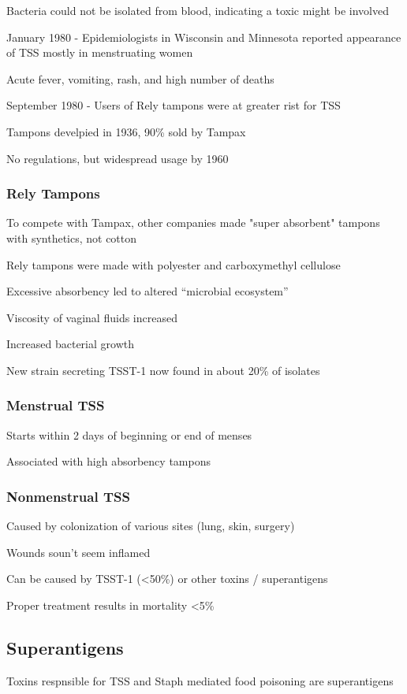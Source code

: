 \documentclass{notes}
\begin{document}
Bacteria could not be isolated from blood, indicating a toxic might be involved

January 1980 - Epidemiologists in Wisconsin and Minnesota reported appearance of TSS mostly in menstruating women

\tab \indicates Acute fever, vomiting, rash, and high number of deaths

September 1980 - Users of Rely tampons were at greater rist for TSS

Tampons develpied in 1936, 90\% sold by Tampax

No regulations, but widespread usage by 1960

\subsubsection*{Rely Tampons}
To compete with Tampax, other companies made "super absorbent" tampons with synthetics, not cotton

\tab \indicates Rely tampons were made with polyester and carboxymethyl cellulose

Excessive absorbency led to altered ``microbial ecosystem''

Viscosity of vaginal fluids increased

Increased bacterial growth

New strain secreting TSST-1 now found in about 20\% of isolates

\subsubsection*{Menstrual TSS}
Starts within 2 days of beginning or end of menses

Associated with high absorbency tampons

\subsubsection*{Nonmenstrual TSS}
Caused by colonization of various sites (lung, skin, surgery)

Wounds soun't seem inflamed

Can be caused by TSST-1 (\textless 50\%) or other toxins / superantigens

Proper treatment results in mortality \textless 5\%

\subsection*{Superantigens}
Toxins respnsible for TSS and Staph mediated food poisoning are superantigens
\end{document}
